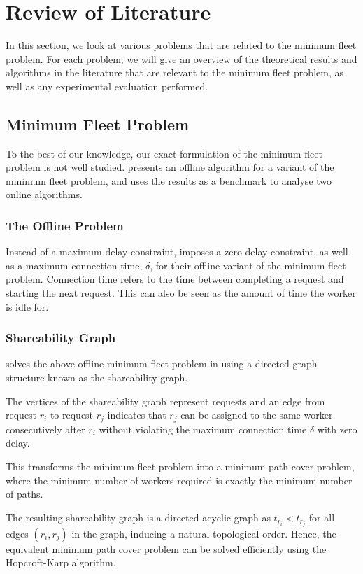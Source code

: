 \documentclass[urop]{nurop}
\begin{document}
\section{Review of Literature}
\label{lit}
In this section, we look at various problems that are related to the minimum fleet problem. For each problem, we will give an overview of the theoretical results and algorithms in the literature that are relevant to the minimum fleet problem, as well as any experimental evaluation performed. 

\subsection{Minimum Fleet Problem}
To the best of our knowledge, our exact formulation of the minimum fleet problem is not well studied. \cite{nature} presents an offline algorithm for a variant of the minimum fleet problem, and uses the results as a benchmark to analyse two online algorithms.

\subsubsection{The Offline Problem}
Instead of a maximum delay constraint, \cite{nature} imposes a zero delay constraint, as well as a maximum connection time, $\delta$, for their offline variant of the minimum fleet problem. Connection time refers to the time between completing a request and starting the next request. This can also be seen as the amount of time the worker is idle for. 

\subsubsection{Shareability Graph}
\cite{nature} solves the above offline minimum fleet problem in using a directed graph structure known as the shareability graph.

The vertices of the shareability graph represent requests and an edge from request $r_i$ to request $r_j$ indicates that $r_j$ can be assigned to the same worker consecutively after $r_i$ without violating the maximum connection time $\delta$ with zero delay.

This transforms the minimum fleet problem into a minimum path cover problem, where the minimum number of workers required is exactly the minimum number of paths.

The resulting shareability graph is a directed acyclic graph as $t_{r_i} < t_{r_j}$ for all edges $(r_i, r_j)$ in the graph, inducing a natural topological order. Hence, the equivalent minimum path cover problem can be solved efficiently using the Hopcroft-Karp algorithm.
\end{document}
